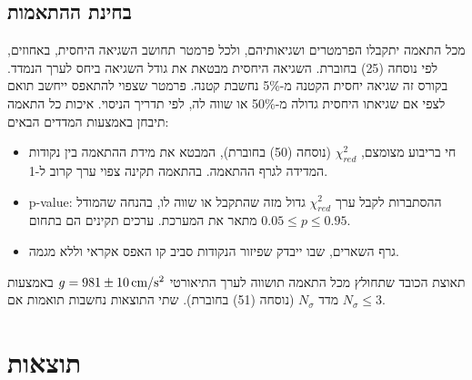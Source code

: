 \documentclass[10pt,a4paper]{article}
\newcommand{\textenglish}[1]{\foreignlanguage{english}{#1}}
\newcommand{\added}[1]{\textcolor{addedblue}{#1}}
\newcommand{\U}[1]{\,\mathrm{#1}}
\begin{document}
\subsection*{בחינת ההתאמות}
מכל התאמה יתקבלו הפרמטרים ושגיאותיהם, ולכל פרמטר תחושב השגיאה היחסית, באחוזים, לפי נוסחה (25) בחוברת. השגיאה היחסית מבטאת את גודל השגיאה ביחס לערך הנמדד. בקורס זה שגיאה יחסית הקטנה מ-5\% נחשבת קטנה.
\added{פרמטר שצפוי להתאפס ייחשב תואם לצפי אם שגיאתו היחסית גדולה מ-50\% או שווה לה, לפי תדריך הניסוי.}
איכות כל התאמה תיבחן באמצעות המדדים הבאים:
\begin{itemize}
  \item חי בריבוע מצומצם, $\chi^2_{red}$ (נוסחה (50) בחוברת), המבטא את מידת ההתאמה בין נקודות המדידה לגרף ההתאמה. בהתאמה תקינה צפוי ערך קרוב ל-1.
  \item \textenglish{p-value}: ההסתברות לקבל ערך $\chi^2_{red}$ גדול מזה שהתקבל או שווה לו, בהנחה שהמודל מתאר את המערכת. ערכים תקינים הם בתחום $0.05 \le p \le 0.95$.
  \item גרף השארים, שבו ייבדק שפיזור הנקודות סביב קו האפס אקראי וללא מגמה.
\end{itemize}
תאוצת הכובד שתחולץ מכל התאמה תושווה לערך התיאורטי $g = \GTheo\U{cm/s^2}$ באמצעות מדד $N_\sigma$ (נוסחה (51) בחוברת). שתי התוצאות נחשבות תואמות אם $N_\sigma \le 3$.

\section*{תוצאות}
\end{document}
